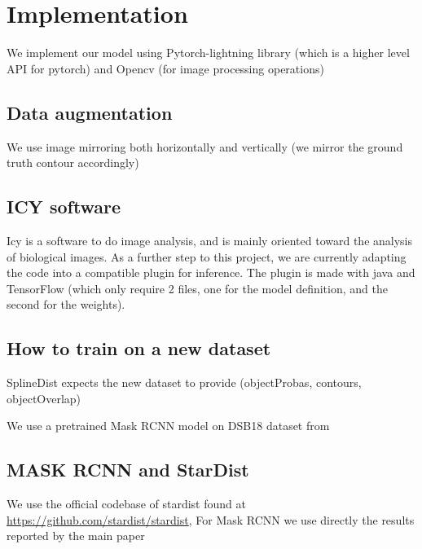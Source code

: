 \documentclass[main.tex]{subfiles}
\begin{document}
\chapter{Implementation}
We implement our model using Pytorch-lightning library (which is a higher level API for pytorch) and Opencv (for image processing operations) 

\section{Data augmentation}
We use image mirroring both horizontally and vertically (we mirror the ground truth contour accordingly)
\section{ICY software}
Icy is a software to do image analysis, and is mainly oriented toward the analysis of biological images. As a further step to this project, we are currently adapting the code into a compatible plugin for inference. The plugin is made with java and TensorFlow (which only require 2 files, one for the model definition, and the second for the weights).

\section{How to train on a new dataset}
SplineDist expects the new dataset to provide (objectProbas, contours, objectOverlap) 

We use a pretrained Mask RCNN model on DSB18 dataset from 
\section{MASK RCNN and StarDist}
We use the official codebase of stardist found at \url{https://github.com/stardist/stardist},
For Mask RCNN we use directly the results reported by the main paper
\end{document}
